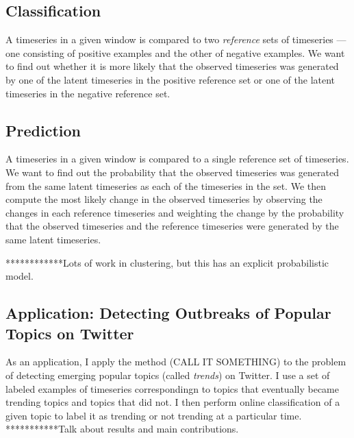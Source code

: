 \subsection{Classification}
A timeseries in a given window is compared to two {\em reference} sets of timeseries --- one consisting of positive examples and the other of negative examples. We want to find out whether it is more likely that the observed timeseries was generated by one of the latent timeseries in the positive reference set or one of the latent timeseries in the negative reference set.

\subsection{Prediction} A timeseries in a given window is compared to a single reference set of timeseries. We want to find out the probability that the observed timeseries was generated from the same latent timeseries as each of the timeseries in the set. We then compute the most likely change in the observed timeseries by observing the changes in each reference timeseries and weighting the change by the probability that the observed timeseries and the reference timeseries were generated by the same latent timeseries.
 
************Lots of work in clustering, but this has an explicit probabilistic model.

\subsection{Application: Detecting Outbreaks of Popular Topics on Twitter}
As an application, I apply the method (CALL IT SOMETHING) to the problem of detecting emerging popular topics (called {\em trends}) on Twitter. I use a set of labeled examples of timeseries correspondingn to topics that eventually became trending topics and topics that did not. I then perform online classification of a given topic to label it as trending or not trending at a particular time.
***********Talk about results and main contributions.
